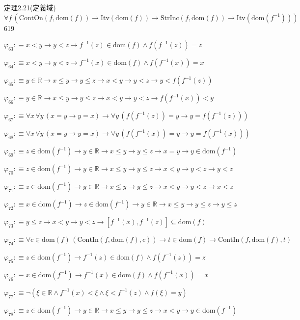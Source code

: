 \begin{fullproof}{定理2.21(定義域)}{$\forall f\,(\mathrm{ContOn}(f,\mathrm{dom}(f)) \to \mathrm{Itv}(\mathrm{dom}(f)) \to \mathrm{StrInc}(f,\mathrm{dom}(f)) \to \mathrm{Itv}(\mathrm{dom}(f^{-1})))$}{619}
\begin{abbrevlist}
\item $\varphi_{63} :\equiv x < y \to y < z \to f^{-1}(z) \in \mathrm{dom}(f) \land f(f^{-1}(z)) = z$
\item $\varphi_{64} :\equiv x < y \to y < z \to f^{-1}(x) \in \mathrm{dom}(f) \land f(f^{-1}(x)) = x$
\item $\varphi_{65} :\equiv y \in \mathbb{R} \to x \leq y \to y \leq z \to x < y \to y < z \to y < f(f^{-1}(z))$
\item $\varphi_{66} :\equiv y \in \mathbb{R} \to x \leq y \to y \leq z \to x < y \to y < z \to f(f^{-1}(x)) < y$
\item $\varphi_{67} :\equiv \forall x\,\forall y\,(x = y \to y = x) \to \forall y\,(f(f^{-1}(z)) = y \to y = f(f^{-1}(z)))$
\item $\varphi_{68} :\equiv \forall x\,\forall y\,(x = y \to y = x) \to \forall y\,(f(f^{-1}(x)) = y \to y = f(f^{-1}(x)))$
\item $\varphi_{69} :\equiv z \in \mathrm{dom}(f^{-1}) \to y \in \mathbb{R} \to x \leq y \to y \leq z \to x = y \to y \in \mathrm{dom}(f^{-1})$
\item $\varphi_{70} :\equiv z \in \mathrm{dom}(f^{-1}) \to y \in \mathbb{R} \to x \leq y \to y \leq z \to x < y \to y < z \to y < z$
\item $\varphi_{71} :\equiv z \in \mathrm{dom}(f^{-1}) \to y \in \mathbb{R} \to x \leq y \to y \leq z \to x < y \to y < z \to x < z$
\item $\varphi_{72} :\equiv x \in \mathrm{dom}(f^{-1}) \to z \in \mathrm{dom}(f^{-1}) \to y \in \mathbb{R} \to x \leq y \to y \leq z \to y \leq z$
\item $\varphi_{73} :\equiv y \leq z \to x < y \to y < z \to [f^{-1}(x),f^{-1}(z)] \subseteq \mathrm{dom}(f)$
\item $\varphi_{74} :\equiv \forall c \in \mathrm{dom}(f)\,(\mathrm{ContIn}(f,\mathrm{dom}(f),c)) \to t \in \mathrm{dom}(f) \to \mathrm{ContIn}(f,\mathrm{dom}(f),t)$
\item $\varphi_{75} :\equiv z \in \mathrm{dom}(f^{-1}) \to f^{-1}(z) \in \mathrm{dom}(f) \land f(f^{-1}(z)) = z$
\item $\varphi_{76} :\equiv x \in \mathrm{dom}(f^{-1}) \to f^{-1}(x) \in \mathrm{dom}(f) \land f(f^{-1}(x)) = x$
\item $\varphi_{77} :\equiv \neg (\xi \in \mathbb{R} \land f^{-1}(x) < \xi \land \xi < f^{-1}(z) \land f(\xi) = y)$
\item $\varphi_{78} :\equiv z \in \mathrm{dom}(f^{-1}) \to y \in \mathbb{R} \to x \leq y \to y \leq z \to x < y \to y \in \mathrm{dom}(f^{-1})$

\end{abbrevlist}
\end{fullproof}
